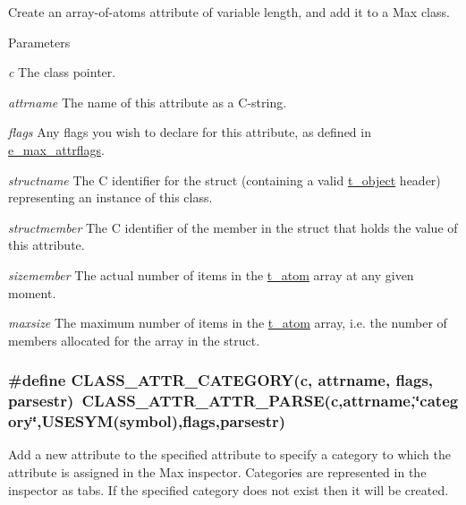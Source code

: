Create an array-\/of-\/atoms attribute of variable length, and add it to a Max class. 
\begin{DoxyParams}{Parameters}
\item[{\em c}]The class pointer. \item[{\em attrname}]The name of this attribute as a C-\/string. \item[{\em flags}]Any flags you wish to declare for this attribute, as defined in \hyperlink{group__attr_gaf296cfc6741bb19207f6ed8062809115}{e\_\-max\_\-attrflags}. \item[{\em structname}]The C identifier for the struct (containing a valid \hyperlink{structt__object}{t\_\-object} header) representing an instance of this class. \item[{\em structmember}]The C identifier of the member in the struct that holds the value of this attribute. \item[{\em sizemember}]The actual number of items in the \hyperlink{structt__atom}{t\_\-atom} array at any given moment. \item[{\em maxsize}]The maximum number of items in the \hyperlink{structt__atom}{t\_\-atom} array, i.e. the number of members allocated for the array in the struct. \end{DoxyParams}
\hypertarget{group__attr_ga1bae4d6ba42e2a7cc9e1bc648ccfb421}{
\subsubsection[{CLASS\_\-ATTR\_\-CATEGORY}]{\setlength{\rightskip}{0pt plus 5cm}\#define CLASS\_\-ATTR\_\-CATEGORY(c, \/  attrname, \/  flags, \/  parsestr)~CLASS\_\-ATTR\_\-ATTR\_\-PARSE(c,attrname,\char`\"{}category\char`\"{},USESYM(symbol),flags,parsestr)}}
\label{group__attr_ga1bae4d6ba42e2a7cc9e1bc648ccfb421}


Add a new attribute to the specified attribute to specify a category to which the attribute is assigned in the Max inspector. Categories are represented in the inspector as tabs. If the specified category does not exist then it will be created.


